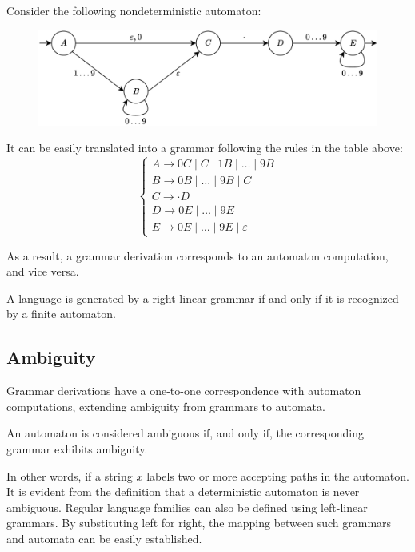 \renewcommand*{\arraystretch}{1}
\begin{example}
    Consider the following nondeterministic automaton:
    \begin{figure}[H]
        \centering
        \includegraphics[width=0.75\linewidth]{images/nfsa.png}
    \end{figure}
    It can be easily translated into a grammar following the rules in the table above:
    \[\begin{cases}
        A \rightarrow 0C\mid C\mid 1B\mid \dots\mid 9B \\
        B \rightarrow 0B\mid \dots\mid 9B\mid C \\
        C \rightarrow \cdot D \\
        D \rightarrow 0E\mid \dots\mid 9E \\
        E \rightarrow 0E\mid \dots\mid 9E\mid \varepsilon
    \end{cases}\]
\end{example}
As a result, a grammar derivation corresponds to an automaton computation, and vice versa.
\begin{proposition}
    A language is generated by a right-linear grammar if and only if it is recognized by a finite automaton.
\end{proposition}

\subsection{Ambiguity}
Grammar derivations have a one-to-one correspondence with automaton computations, extending ambiguity from grammars to automata.
\begin{definition}
    An automaton is considered ambiguous if, and only if, the corresponding grammar exhibits ambiguity. 
\end{definition}
In other words, if a string $x$ labels two or more accepting paths in the automaton.
It is evident from the definition that a deterministic automaton is never ambiguous. 
Regular language families can also be defined using left-linear grammars. 
By substituting left for right, the mapping between such grammars and automata can be easily established.